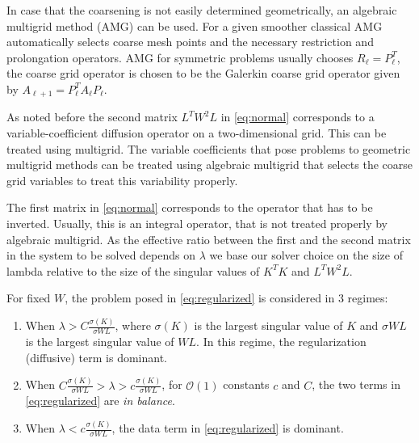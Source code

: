 In case that the coarsening is not easily determined geometrically, an
algebraic multigrid method (AMG) can be used. For a given smoother
classical AMG automatically selects coarse mesh points and the
necessary restriction and prolongation operators. AMG for symmetric
problems usually chooses $R_\ell = P_\ell^T$, the coarse grid operator
is chosen to be the Galerkin coarse grid operator given by
$A_{\ell+1} = P_\ell^T A_\ell P_\ell$.

As noted before the second matrix $L^T W^2 L$ in \eqref{eq:normal}
corresponds to a variable-coefficient diffusion operator on a
two-dimensional grid. This can be treated using multigrid. The
variable coefficients that pose problems to geometric multigrid
methods can be treated using algebraic multigrid that selects the
coarse grid variables to treat this variability properly.

The first matrix in \eqref{eq:normal} corresponds to the operator that
has to be inverted. Usually, this is an integral operator, that is not
treated properly by algebraic multigrid. As the effective ratio
between the first and the second matrix in the system to be solved
depends on $\lambda$ we base our solver choice on the size of lambda
relative to the size of the singular values of $K^T K$ and $L^T W^2
L$.

For fixed $W$, the problem posed in \eqref{eq:regularized} is considered in 3 regimes:
\begin{enumerate}
\item When $\lambda > C \frac{\sigma(K)}{\sigma{WL}}$, where
  $\sigma(K)$ is the largest singular value of $K$ and $\sigma{WL}$ is
  the largest singular value of $WL$.  In this regime, the
  regularization (diffusive) term is dominant.
\item When $C \frac{\sigma(K)}{\sigma{WL}} > \lambda > c
  \frac{\sigma(K)}{\sigma{WL}}$, for $\mathcal{O}(1)$ constants $c$
  and $C$, the two terms in \eqref{eq:regularized} are {\it in
    balance}.
\item When $\lambda < c \frac{\sigma(K)}{\sigma{WL}}$, the data term
  in \eqref{eq:regularized} is dominant.
\end{enumerate}

